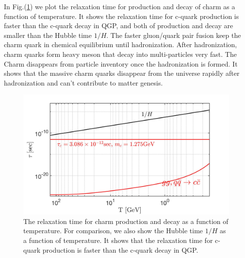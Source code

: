 \documentclass[universe,article,submit,moreauthors,pdftex,a4paper]{Definitions/mdpi}
\begin{document}
In Fig.(\ref{Creaction_fig}) we plot the relaxation time for production and decay of charm as a function of temperature. It shows the relaxation time for c-quark production is faster than the c-quark decay in QGP, and both of production and decay are smaller than the Hubble time $1/H$. The faster gluon/quark pair fusion keep the charm quark in chemical equilibrium until hadronization. After hadronization, charm quarks form heavy meson that decay into multi-particles very fast. The Charm disappears from particle inventory once the hadronization is formed. It shows that the massive charm quarks disappear from the universe rapidly after hadronization and can’t contribute to matter genesis.
\begin{figure} %
\centering
\includegraphics[width=\linewidth]{BottomCharm.jpg}
\caption{The relaxation time for charm production and decay as a function of temperature. For comparison, we also show the Hubble time $1/H$ as a function of temperature. It shows that the relaxation time for c-quark production is faster than the c-quark decay in QGP.
 }
\label{Creaction_fig}
\end{figure}
\end{document}
